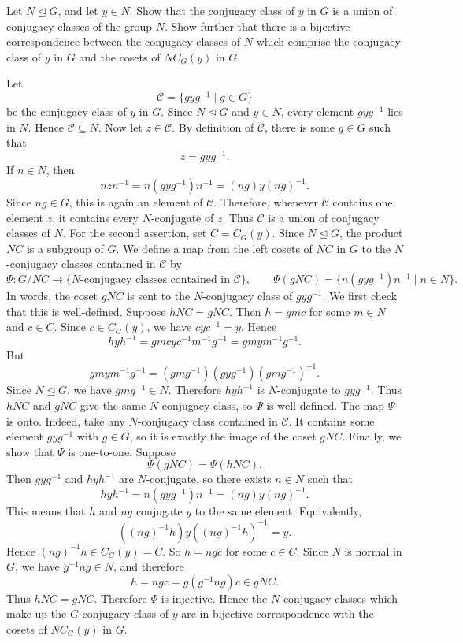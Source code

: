 \documentclass[../Odyssey_Project.tex]{subfiles}
\begin{document}
\begin{exercise}
\label{ex:3.5}
Let $N \trianglelefteq G$, and let $y \in N$. Show that the conjugacy class of $y$ in $G$ is a union of conjugacy classes of the group $N$. Show further that there is a bijective correspondence between the conjugacy classes of $N$ which comprise the conjugacy class of $y$ in $G$ and the cosets of $N C_G(y)$ in $G$.
\end{exercise}
\begin{solution}
    Let
    \[
        \mathcal{C} = \{gyg^{-1} \mid g \in G\}
    \]
    be the conjugacy class of $y$ in $G$. Since $N \trianglelefteq G$ and $y \in N$, every element $gyg^{-1}$ lies in $N$. Hence $\mathcal{C} \subseteq N$.
    Now let $z \in \mathcal{C}$. By definition of $\mathcal{C}$, there is some $g \in G$ such that
    \[
        z = gyg^{-1}.
    \]
    If $n \in N$, then
    \[
        nzn^{-1}
        = n(gyg^{-1})n^{-1}
        = (ng)y(ng)^{-1}.
    \]
    Since $ng \in G$, this is again an element of $\mathcal{C}$. Therefore, whenever $\mathcal{C}$ contains one element $z$, it contains every $N$-conjugate of $z$. Thus $\mathcal{C}$ is a union of conjugacy classes of $N$.
    For the second assertion, set $C = C_G(y)$. Since $N \trianglelefteq G$, the product $NC$ is a subgroup of $G$. We define a map from the left cosets of $NC$ in $G$ to the $N$-conjugacy classes contained in $\mathcal{C}$ by
    \[
        \Psi \colon G/NC \to \{\text{$N$-conjugacy classes contained in }\mathcal{C}\},
        \qquad
        \Psi(gNC) = \{n(gyg^{-1})n^{-1} \mid n \in N\}.
    \]
    In words, the coset $gNC$ is sent to the $N$-conjugacy class of $gyg^{-1}$.
    We first check that this is well-defined. Suppose $hNC = gNC$. Then $h = gmc$ for some $m \in N$ and $c \in C$. Since $c \in C_G(y)$, we have $cyc^{-1} = y$. Hence
    \[
        hyh^{-1}
        = gmcyc^{-1}m^{-1}g^{-1}
        = gmym^{-1}g^{-1}.
    \]
    But
    \[
        gmym^{-1}g^{-1}
        =
        (gmg^{-1})(gyg^{-1})(gmg^{-1})^{-1}.
    \]
    Since $N \trianglelefteq G$, we have $gmg^{-1} \in N$. Therefore $hyh^{-1}$ is $N$-conjugate to $gyg^{-1}$. Thus $hNC$ and $gNC$ give the same $N$-conjugacy class, so $\Psi$ is well-defined.
    The map $\Psi$ is onto. Indeed, take any $N$-conjugacy class contained in $\mathcal{C}$. It contains some element $gyg^{-1}$ with $g \in G$, so it is exactly the image of the coset $gNC$.
    Finally, we show that $\Psi$ is one-to-one. Suppose
    \[
        \Psi(gNC) = \Psi(hNC).
    \]
    Then $gyg^{-1}$ and $hyh^{-1}$ are $N$-conjugate, so there exists $n \in N$ such that
    \[
        hyh^{-1}
        = n(gyg^{-1})n^{-1}
        = (ng)y(ng)^{-1}.
    \]
    This means that $h$ and $ng$ conjugate $y$ to the same element. Equivalently,
    \[
        ((ng)^{-1}h)y((ng)^{-1}h)^{-1} = y.
    \]
    Hence $(ng)^{-1}h \in C_G(y) = C$. So $h = ngc$ for some $c \in C$. Since $N$ is normal in $G$, we have $g^{-1}ng \in N$, and therefore
    \[
        h = ngc = g(g^{-1}ng)c \in gNC.
    \]
    Thus $hNC = gNC$. Therefore $\Psi$ is injective.
    Hence the $N$-conjugacy classes which make up the $G$-conjugacy class of $y$ are in bijective correspondence with the cosets of $NC_G(y)$ in $G$.
\end{solution}
\end{document}
